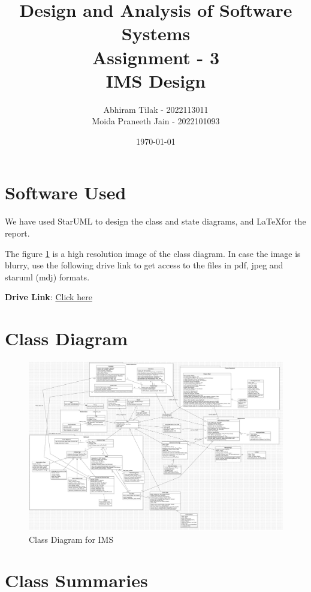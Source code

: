\documentclass[11pt]{article}
\title{ Design and Analysis of Software Systems \\ Assignment - 3 \\ IMS Design}
\author{ Abhiram Tilak - 2022113011 \\ Moida Praneeth Jain - 2022101093 }
\date{\today}
\begin{document}
\maketitle

\section{Software Used}

We have used StarUML to design the class and state diagrams,
and \LaTeX  for the report.

The figure \ref{class} is a high resolution image of the class diagram. In case the image is blurry,
use the following drive link to get access to the files in pdf, jpeg and staruml (mdj) formats.

\textbf{Drive Link}:
\href{https://drive.google.com/drive/folders/11Ny20CPKdCzYMR9YE5TyfA2cOrGUOi8e?usp=sharing}{Click here}


\section{Class Diagram}

\pagebreak

\begin{figure}[!ht]
    \center
\includegraphics[width=8in,angle=90]{class_diagram/Main.png}
\caption{Class Diagram for IMS}
\label{class}
\end{figure}

\pagebreak

\section{Class Summaries}
\end{document}
